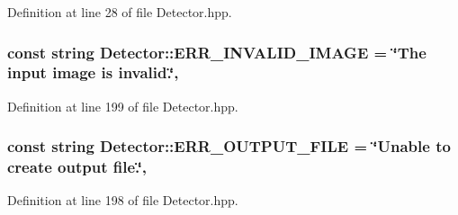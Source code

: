 Definition at line 28 of file Detector.\-hpp.

\hypertarget{classmultiscale_1_1analysis_1_1Detector_aa5dc8982745f567379e0eccd416c6820}{
\subsubsection[{E\-R\-R\-\_\-\-I\-N\-V\-A\-L\-I\-D\-\_\-\-I\-M\-A\-G\-E}]{\setlength{\rightskip}{0pt plus 5cm}const string Detector\-::\-E\-R\-R\-\_\-\-I\-N\-V\-A\-L\-I\-D\-\_\-\-I\-M\-A\-G\-E = \char`\"{}The input {\bf image} is invalid.\char`\"{}\hspace{0.3cm}{\ttfamily [static]}, {\ttfamily [protected]}}}\label{classmultiscale_1_1analysis_1_1Detector_aa5dc8982745f567379e0eccd416c6820}


Definition at line 199 of file Detector.\-hpp.

\hypertarget{classmultiscale_1_1analysis_1_1Detector_aab6b3a68e93cad9a93885e52f1c2ce04}{
\subsubsection[{E\-R\-R\-\_\-\-O\-U\-T\-P\-U\-T\-\_\-\-F\-I\-L\-E}]{\setlength{\rightskip}{0pt plus 5cm}const string Detector\-::\-E\-R\-R\-\_\-\-O\-U\-T\-P\-U\-T\-\_\-\-F\-I\-L\-E = \char`\"{}Unable to create output file.\char`\"{}\hspace{0.3cm}{\ttfamily [static]}, {\ttfamily [protected]}}}\label{classmultiscale_1_1analysis_1_1Detector_aab6b3a68e93cad9a93885e52f1c2ce04}


Definition at line 198 of file Detector.\-hpp.

